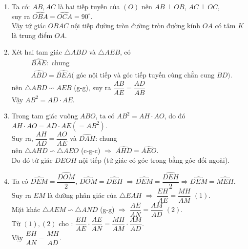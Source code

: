 \begin{bt}
{\begin{enumerate}
	\item Ta có: $AB, AC$ là hai tiếp tuyến của $(O)$ nên $AB\perp OB$, $AC\perp OC$,\\
	 suy ra $\widehat{OBA}=\widehat{OCA}= 90^\circ$.\\
	Vậy tứ giác $OBAC$  nội tiếp đường tròn đường tròn đường kính $OA$ có tâm $K$ là trung điểm $OA$.
	\item Xét hai tam giác $\triangle ABD$ và $\triangle AEB $, có
	\begin{align*}
		&\widehat{BAE}: \text{ chung}\\
		& \widehat{ABD}=\widehat{BEA} \text{( góc nội tiếp và góc tiếp tuyến cùng chắn cung $BD$).}
	\end{align*}
	nên $\triangle ABD \backsim AEB $ (g-g), suy ra $\dfrac{AB}{AE}=\dfrac{AD}{AB}$\\
	Vậy $AB^2=AD\cdot AE$.\\
	\item Trong tam giác vuông $ABO$, ta có $ AB^2=AH\cdot AO$, do đó $AH\cdot AO = AD\cdot AE (= AB^2)$.\\
	Suy ra, $\dfrac{AH}{AD}=\dfrac{AO}{AE}$ và $\widehat{DAH}$: chung\\
	nên $\triangle AHD \backsim \triangle AEO $ (c-g-c) $\Rightarrow$ $\widehat{AHD}=\widehat{AEO}$.\\
	Do đó tứ giác $DEOH$ nội tiếp (tứ giác có góc trong bằng góc đối ngoài).\\
	\item Ta có $\widehat{DEM}=\dfrac{\widehat{DOM}}{2}$, $\widehat{DOM}=\widehat{DEH}$ $\Rightarrow $$\widehat{DEM}=\dfrac{\widehat{DEH}}{2}$$\Rightarrow $$\widehat{DEM}=\widehat{MEH}.$ \\
	Suy ra  $EM$ là đường phân giác của $\triangle EAH$ $\Rightarrow $ $\dfrac{EH}{AE}=\dfrac{MH}{AM}$ $ (1)$.\\
	Mặt khác $ \triangle AEM \backsim \triangle AND $ (g-g) $\Rightarrow $ $\dfrac{AE}{AN}=\dfrac{AM}{AD}$ $(2)$. \\
	Từ $(1), (2)$ cho : $\dfrac{EH}{AE}\cdot \dfrac{AE}{AN}=\dfrac{MH}{AM}\cdot \dfrac{AM}{AD}$.\\ Vậy  $\dfrac{EH}{AN}=\dfrac{MH}{AD}$.
\end{enumerate}
}

\end{bt}

